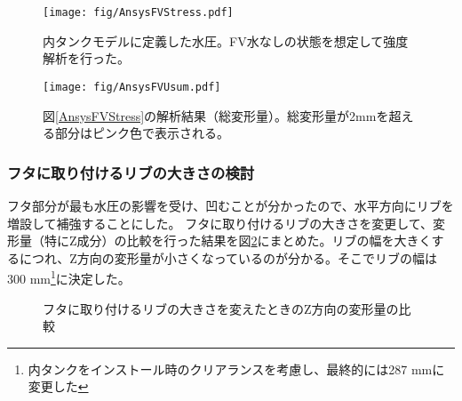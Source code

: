 \documentclass[11pt]{ltjsreport}
\newcommand{\figref}[1]{図\ref{#1}}
\begin{document}
\begin{figure}[htbp]
\begin{minipage}{0.47\textwidth}
\centering
\texttt{[image: fig/AnsysFVStress.pdf]}
\caption[内タンクモデルに定義した水圧]{内タンクモデルに定義した水圧。FV水なしの状態を想定して強度解析を行った。}
\label{AnsysFVStress}
\end{minipage}
\hfill
\begin{minipage}{0.47\textwidth}
\centering
\texttt{[image: fig/AnsysFVUsum.pdf]}
\caption[\figref{AnsysFVStress}の解析結果（総変形量）]{\figref{AnsysFVStress}の解析結果（総変形量）。総変形量が2mmを超える部分はピンク色で表示される。}
\label{AnsysFVUsum}
\end{minipage}
\end{figure}

\subsubsection{フタに取り付けるリブの大きさの検討}
フタ部分が最も水圧の影響を受け、凹むことが分かったので、水平方向にリブを増設して補強することにした。
フタに取り付けるリブの大きさを変更して、変形量（特にZ成分）の比較を行った結果を\figref{AnsysFVf}にまとめた。リブの幅を大きくするにつれ、Z方向の変形量が小さくなっているのが分かる。そこでリブの幅は300 mm\footnote{内タンクをインストール時のクリアランスを考慮し、最終的には287 mmに変更した}に決定した。

\begin{figure}[htbp]
  \begin{minipage}{0.47\textwidth}
  \end{minipage}
  \hfill
  \begin{minipage}{0.47\textwidth}
  \end{minipage}
  \hfill
  \begin{minipage}{0.47\textwidth}
  \end{minipage}
  \hfill \begin{minipage}{0.47\textwidth}
  \end{minipage}
  \hfill
  \begin{minipage}{0.47\textwidth}
  \end{minipage}
  \hfill
    \caption{フタに取り付けるリブの大きさを変えたときのZ方向の変形量の比較}
  \label{AnsysFVf}
\end{figure}
\end{document}
